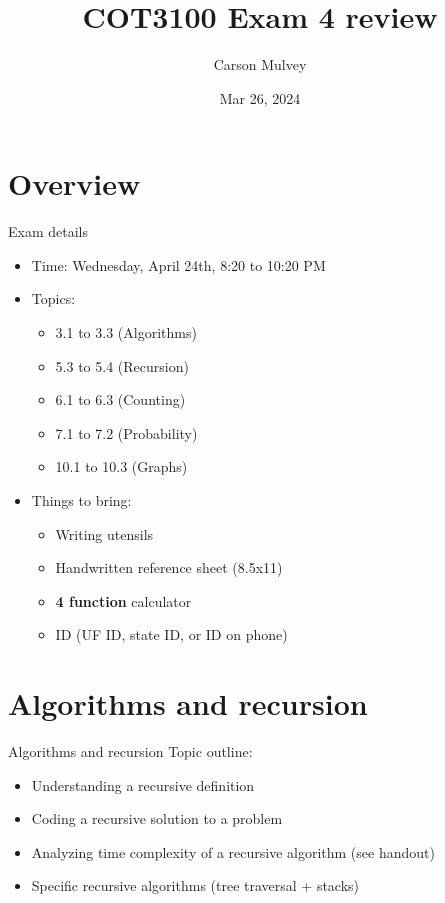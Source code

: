 \documentclass[dvipsnames,t,aspectratio=169]{beamer}
\author{Carson Mulvey}
\title{COT3100 Exam 4 review}
\date{Mar 26, 2024}
\begin{document}
\frame{\titlepage}


\section{Overview}

\begin{frame}{Exam details}
\begin{itemize}
	\item Time: Wednesday, April 24th, 8:20 to 10:20 PM
	\item Topics:
	\begin{itemize}
		\item 3.1 to 3.3 (Algorithms)
		\item 5.3 to 5.4 (Recursion)
		\item 6.1 to 6.3 (Counting)
		\item 7.1 to 7.2 (Probability)
		\item 10.1 to 10.3 (Graphs)
	\end{itemize}
	\item Things to bring:
	\begin{itemize}
		\item Writing utensils
		\item Handwritten reference sheet (8.5x11)
		\item \textbf{4 function} calculator
		\item ID (UF ID, state ID, or ID on phone)
	\end{itemize}
\end{itemize}
\end{frame}

\section{Algorithms and recursion}

\begin{frame}{Algorithms and recursion}
	Topic outline:
	\begin{itemize}
		\item Understanding a recursive definition
		\item Coding a recursive solution to a problem
		\item Analyzing time complexity of a recursive algorithm (see handout) %
		\item Specific recursive algorithms (tree traversal + stacks)
	\end{itemize}
\end{frame}
\end{document}
